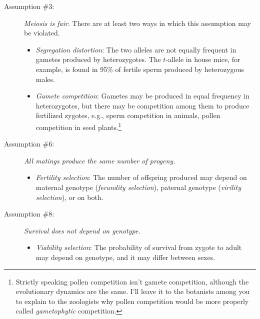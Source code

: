 \begin{description}

\item[Assumption \#3:] {\it Meiosis is fair}. There are at least two
  ways in which this assumption may be violated.

\begin{itemize}

\item {\it Segregation distortion\/}: The two alleles are not equally
  frequent in gametes produced by heterozygotes. The $t$-allele in
  house mice, for example, is found in 95\% of fertile sperm produced
  by heterozygous males.

\item {\it Gamete competition\/}: Gametes may be produced in equal
  frequency in heterozygotes, but there may be competition among them
  to produce fertilized zygotes, e.g., sperm competition in animals,
  pollen competition in seed plants.\footnote{Strictly speaking pollen competition isn't
    gamete competition, although the evolutionary dynamics are the
    same. I'll leave it to the botanists among you to explain to the
    zoologists why pollen competition would be more properly called
    {\it gametophytic\/} competition.}

\end{itemize}

\item[Assumption \#6:] {\it All matings produce the same number of
progeny.}

\begin{itemize}

\item {\it Fertility selection\/}: The number of offspring produced
  may depend on maternal genotype ({\it fecundity selection\/}),
  paternal genotype ({\it virility selection\/}), or on
  both.

\end{itemize}

\item[Assumption \#8:] {\it Survival does not depend on genotype.}

\begin{itemize}

\item {\it Viability selection\/}: The probability of survival from
  zygote to adult may depend on genotype, and it may differ between
  sexes.

\end{itemize}

\end{description}

